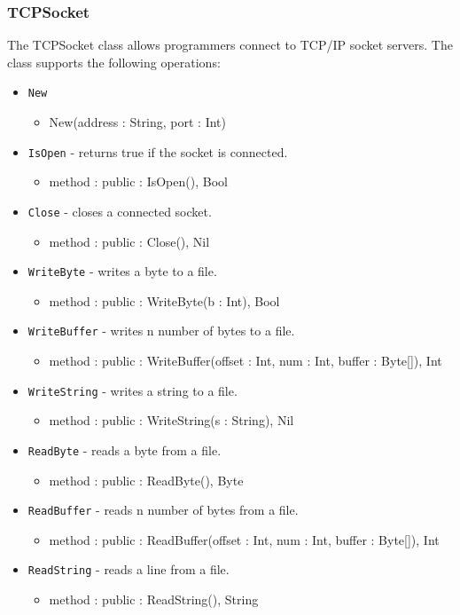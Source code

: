 \documentclass[12pt]{article}
\begin{document}
\subsubsection{TCPSocket}
The TCPSocket class allows programmers connect to TCP/IP socket servers.    The class supports the following operations:
\begin{itemize}
    \item \texttt{New}
    	\begin{itemize}
	\item New(address : String, port : Int)
	\end{itemize}
    \item \texttt{IsOpen} - returns true if the socket is connected.
    	\begin{itemize}
	\item method : public : IsOpen(), Bool
	\end{itemize}
    \item \texttt{Close} - closes a connected socket.
    	\begin{itemize}
	\item method : public : Close(), Nil
	\end{itemize}
    \item \texttt{WriteByte} - writes a byte to a file.
    	\begin{itemize}
	\item method : public : WriteByte(b : Int), Bool
	\end{itemize}
    \item \texttt{WriteBuffer} - writes n number of bytes to a file.
    	\begin{itemize}
	\item method : public : WriteBuffer(offset : Int, num : Int, buffer : Byte[]), Int
	\end{itemize}
    \item \texttt{WriteString} - writes a string to a file.
    	\begin{itemize}
	\item method : public : WriteString(s : String), Nil
	\end{itemize}
    \item \texttt{ReadByte} - reads a byte from a file.
    	\begin{itemize}
	\item method : public : ReadByte(), Byte
	\end{itemize}
    \item \texttt{ReadBuffer} - reads n number of bytes from a file.
    	\begin{itemize}
	\item method : public : ReadBuffer(offset : Int, num : Int, buffer : Byte[]), Int
	\end{itemize}
    \item \texttt{ReadString} - reads a line from a file.
    	\begin{itemize}
	\item method : public : ReadString(), String
	\end{itemize}
\end{itemize}
\end{document}
